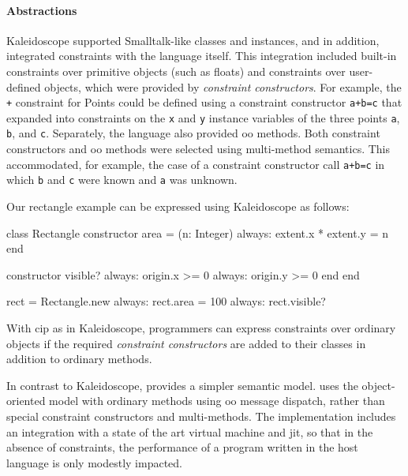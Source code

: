 \paragraph{Abstractions}
Kaleidoscope supported Smalltalk-like classes and instances, and in
addition, integrated constraints with the language itself. This
integration included built-in constraints over primitive objects (such
as floats) and constraints over user-defined objects, which were
provided by \emph{constraint constructors}.  For example, the
\lstinline{+} constraint for Points could be defined using a
constraint constructor \lstinline{a+b=c} that expanded into
constraints on the \lstinline{x} and \lstinline{y} instance variables
of the three points \lstinline{a}, \lstinline{b}, and \lstinline{c}.
Separately, the language also provided \ac{oo} methods.  Both constraint
constructors and \ac{oo} methods were selected using multi-method semantics.
This accommodated, for example, the case of a constraint constructor
call \lstinline{a+b=c} in which \lstinline{b} and \lstinline{c} were
known and \lstinline{a} was unknown.

Our rectangle example can be expressed using Kaleidoscope as follows:
\begin{code}
class Rectangle
  constructor area = (n: Integer)
    always: extent.x * extent.y = n
  end

  constructor visible?
    always: origin.x >= 0
    always: origin.y >= 0
  end
end

rect = Rectangle.new
always: rect.area = 100
always: rect.visible?
\end{code}

With \ac{cip} as in Kaleidoscope, programmers can express constraints
over ordinary objects if the required \emph{constraint constructors}
are added to their classes in addition to ordinary methods.

In contrast to Kaleidoscope, \langname provides a simpler semantic
model. \langname uses the object-oriented model with ordinary
methods using \ac{oo} message dispatch, rather than special constraint
constructors and multi-methods.  The implementation includes an
integration with a state of the art virtual machine and \ac{jit}, so
that in the absence of constraints, the performance of a program
written in the host language is only modestly impacted.


